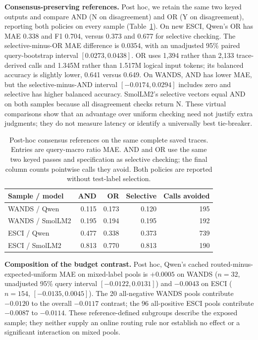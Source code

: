 \textbf{Consensus-preserving references.}
Post hoc, we retain the same two keyed outputs and compare AND (N on disagreement)
and OR (Y on disagreement), reporting both policies on every sample
(Table~\ref{tab:consensus}). On new ESCI, Qwen's OR has MAE 0.338 and F1 0.704,
versus 0.373 and 0.677 for selective checking. The selective-minus-OR MAE
difference is 0.0354, with an unadjusted 95\% paired query-bootstrap interval
$[0.0273,0.0438]$. OR uses 1,394 rather than 2,133 trace-derived calls and
1.345M rather than 1.517M logical input tokens; its balanced accuracy is
slightly lower, 0.641 versus 0.649. On WANDS, AND has lower MAE, but the
selective-minus-AND interval $[-0.0174,0.0294]$ includes zero and selective
has higher balanced accuracy. SmolLM2's selective vectors equal AND on both
samples because all disagreement checks return N. These virtual comparisons
show that an advantage over uniform checking need not justify extra judgments;
they do not measure latency or identify a universally best tie-breaker.

\begin{table}[t]
\caption{Post-hoc consensus references on the same complete saved traces.
Entries are query-macro ratio MAE. AND and OR use the same two keyed passes
and specification as selective checking; the final column counts pointwise
calls they avoid. Both policies are reported without test-label selection.}
\label{tab:consensus}
\centering\footnotesize
\begin{tabular}{lrrrr}
\toprule
Sample / model & AND & OR & Selective & Calls avoided \\
\midrule
WANDS / Qwen & 0.115 & 0.173 & 0.120 & 195 \\
WANDS / SmolLM2 & 0.195 & 0.194 & 0.195 & 192 \\
ESCI / Qwen & 0.477 & 0.338 & 0.373 & 739 \\
ESCI / SmolLM2 & 0.813 & 0.770 & 0.813 & 190 \\
\bottomrule
\end{tabular}
\end{table}

\textbf{Composition of the budget contrast.}
Post hoc, Qwen's cached routed-minus-expected-uniform MAE on mixed-label pools
is $+0.0005$ on WANDS ($n=32$, unadjusted 95\% query interval
$[-0.0122,0.0131]$) and $-0.0043$ on ESCI ($n=154$,
$[-0.0135,0.0045]$). The 20 all-negative WANDS pools contribute $-0.0120$
to the overall $-0.0117$ contrast; the 96 all-positive ESCI pools contribute
$-0.0087$ to $-0.0114$. These reference-defined subgroups describe the exposed
sample; they neither supply an online routing rule nor establish no effect
or a significant interaction on mixed pools.
